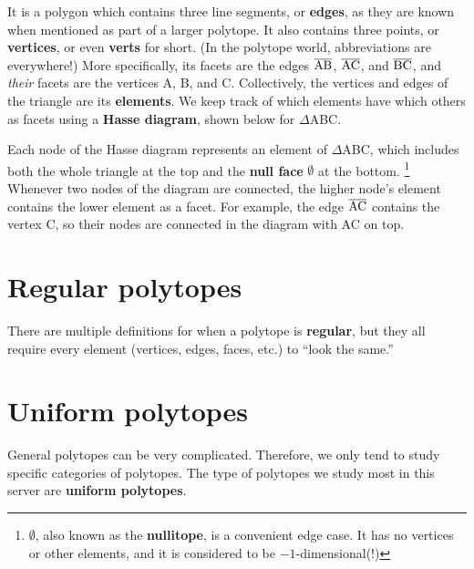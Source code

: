 \documentclass{article}
\begin{document}
It is a polygon which contains three line segments,
or \textbf{edges}, as they are known
when mentioned as part of a larger polytope.
It also contains three points, or \textbf{vertices},
or even \textbf{verts} for short.
(In the polytope world, abbreviations are everywhere!)
More specifically, its facets are the edges
$\overline{\rm AB}$, $\overline{\rm AC}$, and $\overline{\rm BC}$,
and \textit{their} facets are the vertices A, B, and C.
Collectively, the vertices and edges of the triangle are its \textbf{elements}.
We keep track of which elements have which others as facets using a \textbf{Hasse diagram},
shown below for $\Delta$ABC.

\begin{center}
\end{center}

Each node of the Hasse diagram represents an element of $\Delta$ABC,
which includes both the whole triangle at the top
and the \textbf{null face} $\emptyset$ at the bottom.
\footnote{$\emptyset$, also known as the \textbf{nullitope}, is a convenient edge case.
It has no vertices or other elements,
and it is considered to be $-1$-dimensional(!)}
Whenever two nodes of the diagram are connected,
the higher node's element contains the lower element as a facet.
For example, the edge $\overline{\rm AC}$ contains the vertex C,
so their nodes are connected in the diagram with AC on top.

\section{Regular polytopes}
There are multiple definitions for when a polytope is \textbf{regular},
but they all require every element (vertices, edges, faces, etc.) to ``look the same.''

\section{Uniform polytopes}
General polytopes can be very complicated. Therefore, we only tend to study specific categories of polytopes. The type of polytopes we study most in this server are \textbf{uniform polytopes}.
\end{document}
